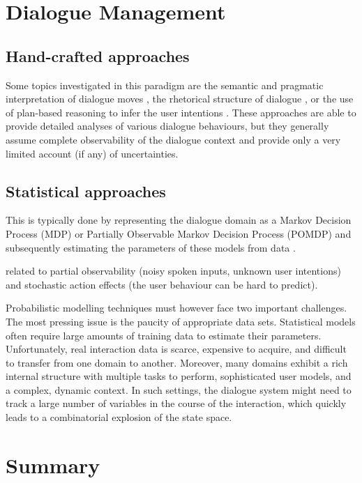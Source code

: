 \section{Dialogue Management}

\subsection{Hand-crafted approaches}

Some topics investigated in this paradigm are the semantic and pragmatic interpretation of dialogue moves \citep{ThomasonManuscript-THOEUA,Ginzburg2012}, the rhetorical structure of dialogue \citep{0521659515}, or the use of plan-based reasoning to infer the user intentions \citep{Allen1980,Litman87}.  These approaches are able to provide detailed analyses of various dialogue behaviours, but they generally assume complete observability of the dialogue context and provide only a very limited account (if any) of uncertainties.



\subsection{Statistical approaches}


This is typically done by representing the dialogue domain as a Markov Decision Process (MDP) or Partially Observable Markov Decision Process (POMDP) and subsequently estimating the parameters of these models from data \citep{Supelec270}. 

 related to partial observability (noisy spoken inputs, unknown user intentions) and stochastic action effects (the user behaviour can be hard to predict). 
 
  Probabilistic modelling techniques must however face two important challenges. The most pressing issue is the paucity of appropriate data sets.  Statistical models often require large amounts of training data to estimate their parameters. Unfortunately, real interaction data is scarce, expensive to acquire, and difficult to transfer from one domain to another.  Moreover, many domains exhibit a rich internal structure with multiple tasks to perform, sophisticated user models, and a complex, dynamic context.  In such settings, the dialogue system might need to track a large number of variables in the course of the interaction, which quickly leads to a combinatorial explosion of the state space.  
  

\section{Summary}

